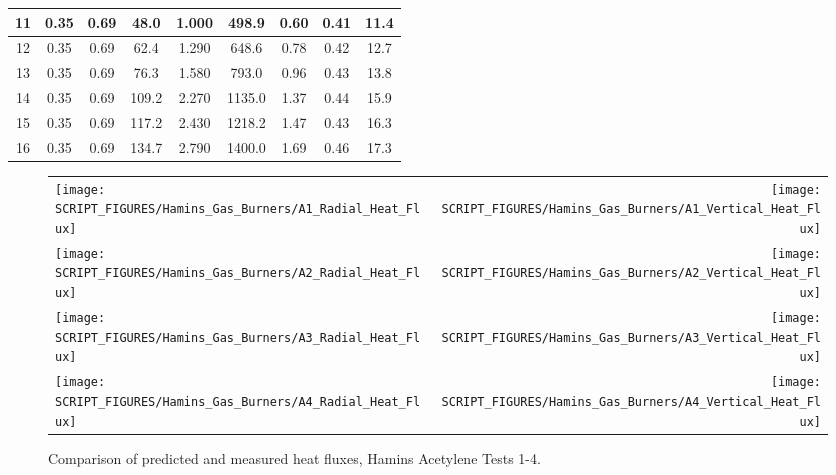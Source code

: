 \begin{table}[ht]
\begin{center}
\begin{tabular}{|c|c|c|c|c|c|c||c|c|}
11       & 0.35     & 0.69       & 48.0        &  1.000                &  498.9         & 0.60         & 0.41     & 11.4             \\ \hline
12       & 0.35     & 0.69       & 62.4        &  1.290                &  648.6         & 0.78         & 0.42     & 12.7             \\ \hline
13       & 0.35     & 0.69       & 76.3        &  1.580                &  793.0         & 0.96         & 0.43     & 13.8             \\ \hline
14       & 0.35     & 0.69       & 109.2       &  2.270                &  1135.0        & 1.37         & 0.44     & 15.9             \\ \hline
15       & 0.35     & 0.69       & 117.2       &  2.430                &  1218.2        & 1.47         & 0.43     & 16.3             \\ \hline
16       & 0.35     & 0.69       & 134.7       &  2.790                &  1400.0        & 1.69         & 0.46     & 17.3             \\ \hline
\end{tabular}
\end{center}
\label{Hamins_Acetylene_Table}
\end{table}

\newpage


\begin{figure}[p]
\begin{tabular*}{\textwidth}{l@{\extracolsep{\fill}}r}
\texttt{[image: SCRIPT\_FIGURES/Hamins\_Gas\_Burners/A1\_Radial\_Heat\_Flux]} &
\texttt{[image: SCRIPT\_FIGURES/Hamins\_Gas\_Burners/A1\_Vertical\_Heat\_Flux]} \\
\texttt{[image: SCRIPT\_FIGURES/Hamins\_Gas\_Burners/A2\_Radial\_Heat\_Flux]} &
\texttt{[image: SCRIPT\_FIGURES/Hamins\_Gas\_Burners/A2\_Vertical\_Heat\_Flux]} \\
\texttt{[image: SCRIPT\_FIGURES/Hamins\_Gas\_Burners/A3\_Radial\_Heat\_Flux]} &
\texttt{[image: SCRIPT\_FIGURES/Hamins\_Gas\_Burners/A3\_Vertical\_Heat\_Flux]} \\
\texttt{[image: SCRIPT\_FIGURES/Hamins\_Gas\_Burners/A4\_Radial\_Heat\_Flux]} &
\texttt{[image: SCRIPT\_FIGURES/Hamins\_Gas\_Burners/A4\_Vertical\_Heat\_Flux]}
\end{tabular*}
\label{Hamins_Acetylene_1-4}
\caption[Heat flux predictions, Hamins acetylene burner Tests 1-4]
{Comparison of predicted and measured heat fluxes, Hamins Acetylene Tests 1-4.}
\end{figure}

